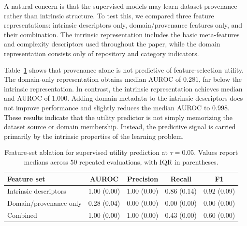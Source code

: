 \documentclass[preprint,12pt,authoryear]{elsarticle}
\begin{document}
A natural concern is that the supervised models may learn dataset provenance rather than intrinsic structure. To test this, we compared three feature representations: intrinsic descriptors only, domain/provenance features only, and their combination. The intrinsic representation includes the basic meta-features and complexity descriptors used throughout the paper, while the domain representation consists only of repository and category indicators.

Table~\ref{tab:feature_set_ablation} shows that provenance alone is not predictive of feature-selection utility. The domain-only representation obtains median AUROC of $0.281$, far below the intrinsic representation. In contrast, the intrinsic representation achieves median and AUROC of $1.000$. Adding domain metadata to the intrinsic descriptors does not improve performance and slightly reduces the median AUROC to $0.998$. These results indicate that the utility predictor is not simply memorizing the dataset source or domain membership. Instead, the predictive signal is carried primarily by the intrinsic properties of the learning problem.


\begin{table}[htbp]
\centering
\footnotesize
\caption{Feature-set ablation for supervised utility prediction at $\tau=0.05$. Values report medians across $50$ repeated evaluations, with IQR in parentheses.}
\label{tab:feature_set_ablation}
\begin{tabular}{lcccc}
\toprule
Feature set & AUROC & Precision & Recall & F1 \\
\midrule
Intrinsic descriptors  & 1.00 (0.00) & 1.00 (0.00) & 0.86 (0.14) & 0.92 (0.09) \\
Domain/provenance only & 0.28 (0.04) & 0.00 (0.00) & 0.00 (0.00) & 0.00 (0.00) \\
Combined               & 1.00 (0.00) & 1.00 (0.00) & 0.43 (0.00) & 0.60 (0.00) \\
\bottomrule
\end{tabular}
\end{table}
\end{document}
